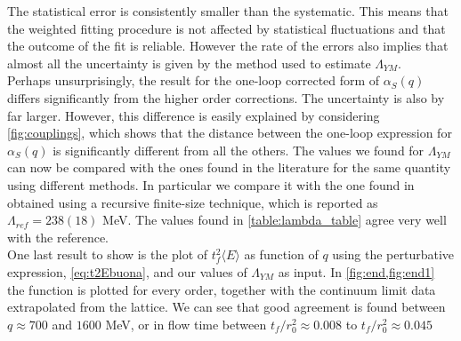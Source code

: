The statistical error is consistently smaller than the systematic. This means that the weighted fitting procedure is not affected by statistical fluctuations and that the outcome of the fit is reliable. However the rate of the errors also implies that almost all the uncertainty is given by the method used to estimate $\Lambda_{YM}$. \\
Perhaps unsurprisingly, the result for the one-loop corrected form of $\alpha_S(q)$ differs significantly from the higher order corrections. The uncertainty is also by far larger. However, this difference is easily explained by considering \cref{fig:couplings}, which shows that the distance between the one-loop expression for $\alpha_S(q)$ is significantly different from all the others. 
The values we found for $\Lambda_{YM}$ can now be compared with the ones found in the literature for the same quantity using different methods. In particular we compare it with the one found in \cite{capitani_non-perturbative_1999} obtained using a recursive finite-size technique, which is reported as $\Lambda_{ref} = 238(18)$ MeV. The values found in \cref{table:lambda_table} agree very well with the reference.\\ 
One last result to show is the plot of $t_f^2\langle E\rangle$ as function of $q$ using the perturbative expression, \cref{eq:t2Ebuona}, and our values of $\Lambda_{YM}$ as input. In \cref{fig:end,fig:end1} the function is plotted for every order, together with the continuum limit data extrapolated from the lattice. We can see that good agreement is found between $q \approx 700$ and $1600$ MeV, or in flow time between $t_f/r_0^2 \approx 0.008$ to $t_f/r_0^2 \approx 0.045$

